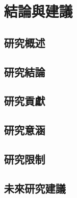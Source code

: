 \chapter{結論與建議}

\section{研究概述}
\section{研究結論}
\section{研究貢獻}
\section{研究意涵}
\section{研究限制}
\section{未來研究建議}
